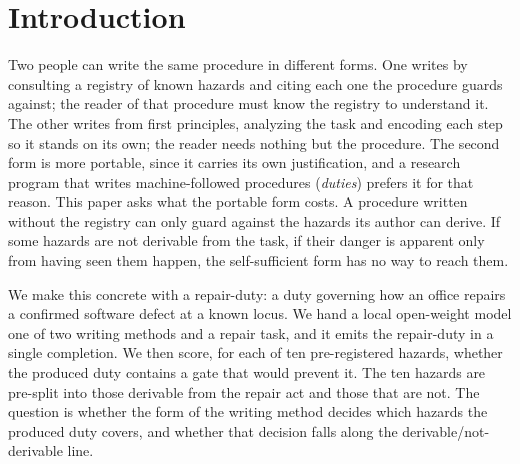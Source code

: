 \documentclass[11pt,a4paper]{article}
\begin{document}
\begin{abstract}
recovers exactly those two (routing 0 to 27 of 30; session-close 1 to 25 of 30)
and not the third, the pure observation-only durability hazard it does not name
(0 to 0 of 30). A blind rater judged coverage and an independent rater agreed
(Cohen's $\kappa$=0.85); the direction is also corroborated without any judge, as
the cartographer form never mentions routing across 30 runs and the scan form
always does. Naming a class of hazard lets first-principles derivation reach it;
a hazard whose badness is only apparent from accumulated observation, and that
belongs to no named class, stays out of reach. The finding is a
direction-and-rate result on one defect specimen and one model; the materials,
runs, and scoring are public and reproduce on a 24~GB GPU with no paid API.
\end{abstract}

\section{Introduction}

Two people can write the same procedure in different forms. One writes by
consulting a registry of known hazards and citing each one the procedure guards
against; the reader of that procedure must know the registry to understand it.
The other writes from first principles, analyzing the task and encoding each
step so it stands on its own; the reader needs nothing but the procedure. The
second form is more portable, since it carries its own justification, and a
research program that writes machine-followed procedures (\emph{duties}) prefers
it for that reason. This paper asks what the portable form costs. A procedure
written without the registry can only guard against the hazards its author can
derive. If some hazards are not derivable from the task, if their danger is
apparent only from having seen them happen, the self-sufficient form has no
way to reach them.

We make this concrete with a repair-duty: a duty governing how an office
repairs a confirmed software defect at a known locus. We hand a local
open-weight model one of two writing methods and a repair task, and it emits the
repair-duty in a single completion. We then score, for each of ten
pre-registered hazards, whether the produced duty contains a gate that would
prevent it. The ten hazards are pre-split into those derivable from the repair
act and those that are not. The question is whether the form of the writing
method decides which hazards the produced duty covers, and whether that decision
falls along the derivable/not-derivable line.
\end{document}
